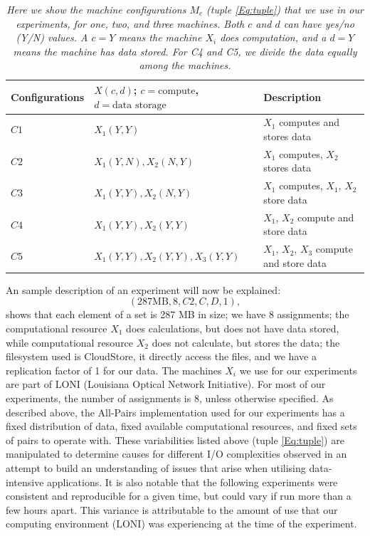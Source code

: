 \documentclass{rspublic}
\begin{document}
\begin{table}
\begin{center}
    \begin{tabular}{ | l | l | l |}
    \hline
    Configurations & $X(c,d)$; $c= \mbox{compute}$, $d=\mbox{data storage}$ & Description  \\ \hline
    $C1$ & $X_1(Y,Y)$  & $X_1$ computes and stores data\\ \hline    
    $C2$ & $X_1(Y,N), X_2(N,Y)$  & $X_1$ computes, $X_2$ stores data \\ \hline
    $C3$ & $X_1(Y,Y), X_2(N,Y)$  & $X_1$ computes, $X_1$, $X_2$ store data \\ \hline
    $C4$ & $X_1(Y,Y), X_2(Y,Y)$  & $X_1$, $X_2$ compute and store data \\ \hline
    $C5$ & $X_1(Y,Y), X_2(Y,Y), X_3(Y,Y)$  & $X_1$, $X_2$, $X_3$ compute and store data \\ 
    \hline
    \end{tabular}
\end{center}
    \caption{\textit{Here we show the machine configurations $M_c$ (tuple
\ref{Eq:tuple}) that we use in our experiments, for one, two, and three
machines. Both $c$ and $d$ can have yes/no (Y/N) values. A $c = Y$ means
the machine $X_i$ does computation, and a $d = Y$ means the machine has
data stored. For C4 and C5, we divide the data equally among the
machines.}}
    \label{Tab:Configs}
\end{table}

An sample description of an experiment will now be explained:
 \begin{equation}
(287 \mbox{MB}, 8, C2, C, D, 1),
\end{equation}
shows that each element of a set is 287 MB in size; we have 8
assignments; the computational resource $X_1$ does calculations, but
does not have data stored, while computational resource $X_2$ does not
calculate, but stores the data; the filesystem used is CloudStore, it
directly access the files, and we have a replication factor of 1 for our
data. The machines $X_i$ we use for our experiments are part of LONI
(Louisiana Optical Network Initiative). For most of our experiments, the
number of assignments is 8, unless otherwise specified. As described
above, the All-Pairs implementation used for our experiments has a fixed
distribution of data, fixed available computational resources, and fixed
sets of pairs to operate with. These variabilities listed above (tuple
\ref{Eq:tuple}) are manipulated to determine causes for different I/O
complexities observed in an attempt to build an understanding of issues
that arise when utilising data-intensive applications. It is also
notable that the following experiments were consistent and reproducible
for a given time, but could vary if run more than a few hours apart.
This variance is attributable to the amount of use that our computing
environment (LONI) was experiencing at the time of the experiment.
\end{document}
